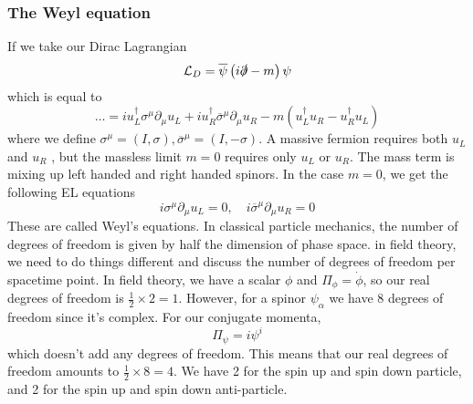 \subsubsection{The Weyl equation} 
If we take our Dirac Lagrangian 
\[
	\mathcal{L}_D  = \overline{\psi} \left(i\slashed{\partial} - m\right)\psi 
\] which is equal to 
\[
 \dots = i u_L ^ \dagger \sigma ^ \mu \partial  _ \mu u _ L + 
 i u _ R ^ \dagger \overline{ \sigma } ^ \mu \partial  _ \mu u _{ R } - m \left(  
 u _ L ^ \dagger u _ R - u _ R ^ \dagger u _ L \right) 
\] where we define $ \sigma ^ \mu = ( I , \sigma ) , \overline{\sigma } ^ \mu = ( I , - \sigma ) $. 
A massive fermion requires both $ u _L $ and $ u _ R $ , but 
the massless limit $ m =0 $ requires only $ u _ L $ or $ u _ R $. 
The mass term is mixing up left handed and right handed spinors. 
In the case  $ m = 0$, we get the following EL equations
\[
 i \sigma ^ \mu \partial  _ \mu u _ L = 0 , \quad i \overline{ \sigma } ^ \mu \partial  _ \mu u _ R  = 0 
\] These are called Weyl's equations. 
In classical particle mechanics, the number of degrees of freedom is given by 
half the dimension of phase space. in field theory, we need to do things different
and discuss the number of degrees of freedom per spacetime point. 
In field theory, we have a scalar $ \phi $ and $ \Pi_{ \phi } = \dot { \phi } $, so our 
real degrees of freedom is $ \frac{1}{2 } \times 2  = 1$. 
However, for a spinor $ \psi _{ \alpha } $ we have 8 degrees of freedom since 
it's complex. For our conjugate momenta, 
\[
 \Pi _{ \psi } = i \psi ^{ i } 
\] which doesn't add any degrees of freedom. This means 
that our real degrees of freedom amounts to $\frac{1}{2 } \times 8  = 4$. 
We have 2 for the spin up and spin down particle, and 2 for the 
spin up and spin down anti-particle. 


